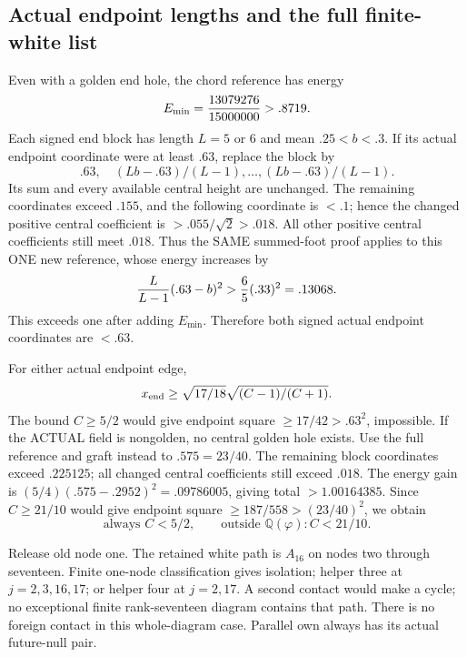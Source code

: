 \documentclass[11pt]{article}
\begin{document}
\subsection{Actual endpoint lengths and the full finite-white list}
\label{app:arithA17endpointlist}

Even with a golden end hole, the chord reference has energy
\[
 E_{\min}={13079276\over15000000}>.8719 .
\]
Each signed end block has length \(L=5\) or \(6\) and mean
\(.25<b<.3\).
If its actual endpoint coordinate were at least \(.63\), replace
the block by
\[
 .63,\quad (Lb-.63)/(L-1),\ldots,(Lb-.63)/(L-1).
\]
Its sum and every available central height are unchanged.
The remaining coordinates exceed \(.155\), and the following
coordinate is \(<.1\); hence the changed positive central
coefficient is \(>.055/\sqrt2>.018\).
All other positive central coefficients still meet \(.018\).
Thus the SAME summed-foot proof applies to this ONE new
reference, whose energy increases by
\[
 {L\over L-1}(.63-b)^2>{6\over5}(.33)^2=.13068.
\]
This exceeds one after adding \(E_{\min}\).
Therefore both signed actual endpoint coordinates are \(<.63\).

For either actual endpoint edge,
\[
 x_{\rm end}\ge\sqrt{17/18}
                        \sqrt{(C-1)/(C+1)} .
\]
The bound \(C\ge5/2\) would give endpoint square
\(\ge17/42>.63^2\), impossible.
If the ACTUAL field is nongolden, no central golden hole exists.
Use the full reference and graft instead to \(.575=23/40\).
The remaining block coordinates exceed \(.225125\);
all changed central coefficients still exceed \(.018\).
The energy gain is
\((5/4)(.575-.2952)^2=.09786005\), giving total
\(>1.00164385\).
Since \(C\ge21/10\) would give endpoint square
\(\ge187/558>(23/40)^2\), we obtain
\[
 \text{always }C<5/2,\qquad
 \text{outside }\mathbb Q(\varphi): C<21/10 .
\tag{A17C}\label{eq:arithA17C}
\]

Release old node one.
The retained white path is \(A_{16}\) on nodes two through
seventeen.  Finite one-node classification gives isolation;
helper three at \(j=2,3,16,17\); or helper four at \(j=2,17\).
A second contact would make a cycle; no exceptional finite
rank-seventeen diagram contains that path.
There is no foreign contact in this whole-diagram case.
Parallel own always has its actual future-null pair.
\end{document}
